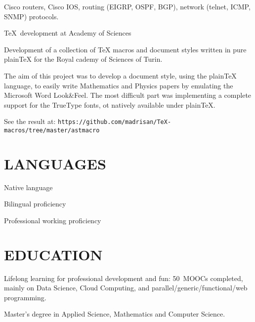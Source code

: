 Cisco routers, Cisco IOS, routing (EIGRP, OSPF, BGP),
network (telnet, ICMP, SNMP) protocols.
   

   {\TeX\ development at Academy of Sciences}

Development of a collection of TeX macros and document styles written in pure plainTeX
for the Royal cademy of Sciences of Turin.

The aim of this project was to develop a document style, using the plainTeX language, 
to easily write Mathematics and Physics papers by emulating the Microsoft Word 
Look\&Feel.
The most difficult part was implementing a complete support for the TrueType fonts,
ot natively available under plain\TeX.

See the result at:
\hfill\break\noindent
{\tt https:/\negthinspace/github.com/madrisan/TeX-macros/tree/master/astmacro}


\section{LANGUAGES}

Native language

Bilingual proficiency

Professional working proficiency


\section{EDUCATION}

\vskip -6pt

Lifelong learning for professional development and fun:
50\smallplus~MOOCs completed, mainly on Data Science, Cloud Computing,
and parallel/generic/functional/web programming.


Master's degree in Applied Science, Mathematics and Computer Science.


